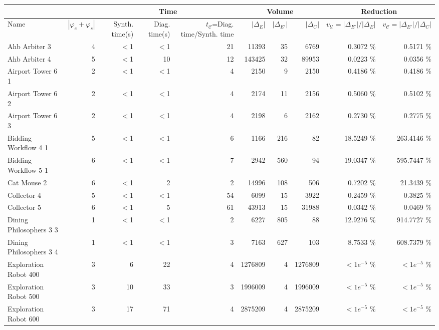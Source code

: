 \begin{tabular}{|l|r|rrr|rrr|rr|}
  \hline  & & \multicolumn{3}{c|}{Time}&\multicolumn{3}{c|}{Volume} & \multicolumn{2}{c|}{Reduction}\\ \hline
Name & $|\varphi_e + \varphi_s|$ & Synth. time(s) & Diag. time(s) & $t_{\mathcal{C}}$=Diag. time/Synth. time & $|\Delta_E|$ & $|\Delta_{E'}|$ & $|\Delta_{C}|$ & $v_{\mathcal{U}}=|\Delta_{E'}|/|\Delta_{E}|$ & $v_{\mathcal{C}}=|\Delta_{E'}|/|\Delta_{C}|$ \\ 
  \hline
Ahb Arbiter 3 &   4 & $<$1 & $<$1 & 21 & 11393 & 35 & 6769 &  0.3072 \% &    0.5171 \% \\ 
  Ahb Arbiter 4 &   5 & $<$1 & 10 & 12 & 143425 & 32 & 89953 &  0.0223 \% &    0.0356 \% \\ 
  Airport Tower 6 1 &   2 & $<$1 & $<$1 & 4 & 2150 & 9 & 2150 &  0.4186 \% &    0.4186 \% \\ 
  Airport Tower 6 2 &   2 & $<$1 & $<$1 & 4 & 2174 & 11 & 2156 &  0.5060 \% &    0.5102 \% \\ 
  Airport Tower 6 3 &   2 & $<$1 & $<$1 & 4 & 2198 & 6 & 2162 &  0.2730 \% &    0.2775 \% \\ 
  Bidding Workflow 4 1 &   5 & $<$1 & $<$1 & 6 & 1166 & 216 &  82 & 18.5249 \% &  263.4146 \% \\ 
  Bidding Workflow 5 1 &   6 & $<$1 & $<$1 & 7 & 2942 & 560 &  94 & 19.0347 \% &  595.7447 \% \\ 
  Cat Mouse 2 &   6 & $<$1 & 2 & 2 & 14996 & 108 & 506 &  0.7202 \% &   21.3439 \% \\ 
  Collector 4 &   5 & $<$1 & $<$1 & 54 & 6099 & 15 & 3922 &  0.2459 \% &    0.3825 \% \\ 
  Collector 5 &   6 & $<$1 & 5 & 61 & 43913 & 15 & 31988 &  0.0342 \% &    0.0469 \% \\ 
  Dining Philosophers 3 3 &   1 & $<$1 & $<$1 & 2 & 6227 & 805 &  88 & 12.9276 \% &  914.7727 \% \\ 
  Dining Philosophers 3 4 &   1 & $<$1 & $<$1 & 3 & 7163 & 627 & 103 &  8.7533 \% &  608.7379 \% \\ 
  Exploration Robot 400 &   3 & 6 & 22 & 4 & 1276809 & 4 & 1276809 & $<1e^{-5}$ \% & $<1e^{-5}$ \% \\ 
  Exploration Robot 500 &   3 & 10 & 33 & 3 & 1996009 & 4 & 1996009 & $<1e^{-5}$ \% & $<1e^{-5}$ \% \\ 
  Exploration Robot 600 &   3 & 17 & 71 & 4 & 2875209 & 4 & 2875209 & $<1e^{-5}$ \% & $<1e^{-5}$ \% \\ 

\end{tabular}
